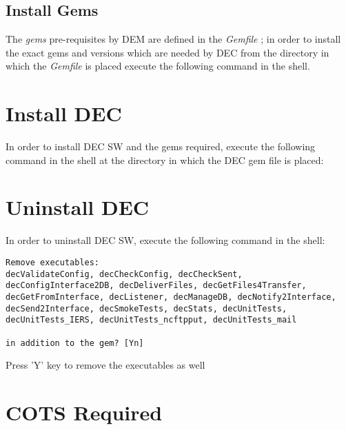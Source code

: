 \documentclass[dec_sum_main.tex]{subfiles}
\begin{document}
\par
{}

\subsection{Install Gems}

\par
\noindent
The \textit{gems} pre-requisites by DEM are defined in the \textit{Gemfile} ; in order to install the exact gems and versions which are needed by DEC from the directory in which the \textit{Gemfile} is placed execute the following command in the shell. \newline

\par
{}

\section{Install DEC}

In order to install DEC SW and the gems required, execute the following command in the shell at the directory in which the DEC gem file is placed:
\par
{}
\par

\section{Uninstall DEC}

In order to uninstall DEC SW, execute the following command in the shell:
\par 
{}
\par 

\begin{verbatim}
Remove executables:
decValidateConfig, decCheckConfig, decCheckSent, decConfigInterface2DB, decDeliverFiles, decGetFiles4Transfer, decGetFromInterface, decListener, decManageDB, decNotify2Interface, decSend2Interface, decSmokeTests, decStats, decUnitTests, decUnitTests_IERS, decUnitTests_ncftpput, decUnitTests_mail

in addition to the gem? [Yn]
\end{verbatim}

Press 'Y' key to remove the executables as well

\section{COTS Required}
\end{document}
